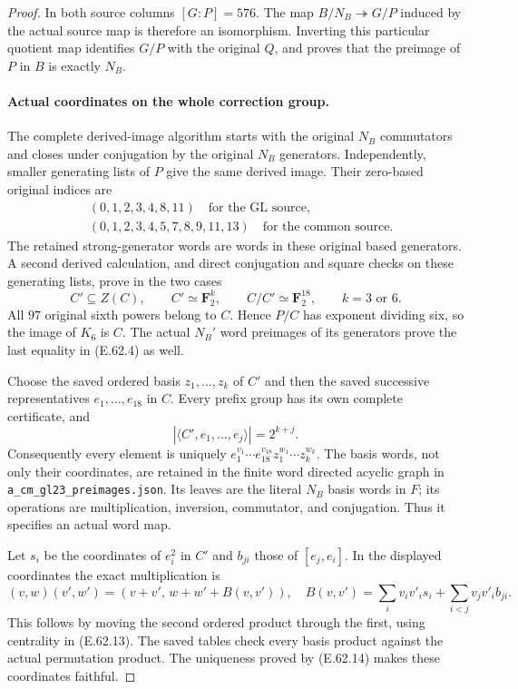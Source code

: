\begin{proof}
In both source columns $[G:P]=576$.  The map
$B/N_B\twoheadrightarrow G/P$ induced by the actual source map is
therefore an isomorphism.  Inverting this particular quotient map
identifies $G/P$ with the original $Q$, and proves that the preimage
of $P$ in $B$ is exactly $N_B$.

\paragraph{Actual coordinates on the whole correction group.}
The complete derived-image algorithm starts with the original
$N_B$ commutators and closes under conjugation by the original
$N_B$ generators.  Independently, smaller generating lists of $P$
give the same derived image.  Their zero-based original indices are
\[
 \begin{split}
 &(0,1,2,3,4,8,11)\quad\text{for the GL source},\\
 &(0,1,2,3,4,5,7,8,9,11,13)\quad\text{for the common source}.
 \end{split}
 \tag{E.62.12}
\]
The retained strong-generator words are words in these original based
generators.  A second derived calculation, and direct conjugation and
square checks on these generating lists, prove in the two cases
\[
 C'\subseteq Z(C),\qquad C'\simeq\mathbf F_2^k,\qquad
 C/C'\simeq\mathbf F_2^{18},\qquad k=3\text{ or }6.
 \tag{E.62.13}
\]
All $97$ original sixth powers belong to $C$.  Hence $P/C$ has exponent
dividing six, so the image of $K_6$ is $C$.  The actual $N_B'$ word
preimages of its generators prove the last equality in
\textup{(E.62.4)} as well.

Choose the saved ordered basis $z_1,\ldots,z_k$ of $C'$ and then the
saved successive representatives $e_1,\ldots,e_{18}$ in $C$.  Every
prefix group has its own complete certificate, and
\[
 |\langle C',e_1,\ldots,e_j\rangle|=2^{k+j}.
 \tag{E.62.14}
\]
Consequently every element is uniquely
$e_1^{v_1}\cdots e_{18}^{v_{18}}z_1^{w_1}\cdots z_k^{w_k}$.
The basis words, not only their coordinates, are retained in the
finite word directed acyclic graph in
\texttt{a\_cm\_gl23\_preimages.json}.  Its leaves are the literal
$N_B$ basis words in $F$; its operations are multiplication, inversion,
commutator, and conjugation.  Thus it specifies an actual word map.

Let $s_i$ be the coordinates of $e_i^2$ in $C'$ and $b_{ji}$ those of
$[e_j,e_i]$.  In the displayed coordinates the exact multiplication is
\[
 (v,w)(v',w')=(v+v',\,w+w'+B(v,v')),
 \quad
 B(v,v')=\sum_i v_iv'_i s_i+\sum_{i<j}v_jv'_i b_{ji}.
 \tag{E.62.15}
\]
This follows by moving the second ordered product through the first,
using centrality in \textup{(E.62.13)}.  The saved tables check every
basis product against the actual permutation product.  The uniqueness
proved by \textup{(E.62.14)} makes these coordinates faithful.


\end{proof}
